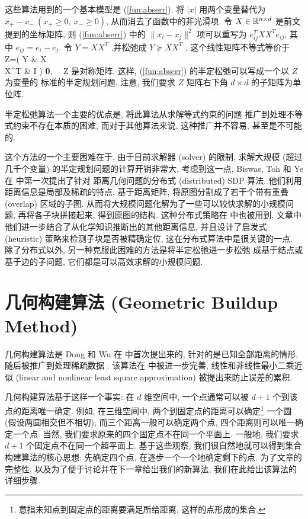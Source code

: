\documentclass{CASthesis_zzk}
\begin{document}
这些算法用到的一个基本模型是 (\ref{fun:abserr}). 
将 $|x|$ 用两个变量替代为 $x_+-x_- ~(x_+\geq 0,~x_-\geq 0)$, 
从而消去了函数中的非光滑项.
令 $X\in \mathbb{R}^{n\times d}$ 是前文提到的坐标矩阵,
则 (\ref{fun:abserr}) 中的 $\|x_i-x_j\|^2$ 项可以重写为 $e_{ij}^TXX^Te_{ij}$, 
其中 $e_{ij}=e_i-e_j$. 
令 $Y=XX^T$ ,并松弛成 $Y\succeq XX^T$ \cite{Boyd1994}, 
这个线性矩阵不等式等价于
\be Z=\left( Y & X \\ X^T & I \ea \right) \succeq \textbf{0}, ~~Z \textrm{ 是对称矩阵}.\ee
这样, (\ref{fun:abserr}) 的半定松弛可以写成一个以 $Z$ 为变量的
标准的半定规划问题. 注意, 我们要求 $Z$ 矩阵右下角 $d \times d$ 的子矩阵为单位阵.

半定松弛算法一个主要的优点是, 将此算法从求解等式约束的问题
推广到处理不等式约束不存在本质的困难, 
而对于其他算法来说, 这种推广并不容易, 甚至是不可能的.

这个方法的一个主要困难在于, 由于目前求解器 (solver) 的限制,
求解大规模 (超过几千个变量) 的半定规划问题的计算开销非常大.
考虑到这一点, Biswas, Toh 和 Ye 在 \cite{Biswas2008} 中第一次提出了针对
距离几何问题的分布式 (distributed) SDP 算法.
他们利用距离信息是局部及稀疏的特点, 基于距离矩阵,
将原图分割成了若干个带有重叠 (overlap) 区域的子图.
从而将大规模问题化解为了一些可以较快求解的小规模问题,
再将各子块拼接起来, 得到原图的结构. 
这种分布式策略在 \cite{Fang2013} 中也被用到, 
文章中他们进一步结合了从化学知识推断出的其他距离信息, 
并且设计了启发式 (heuristic) 策略来检测子块是否被精确定位,
这在分布式算法中是很关键的一点.
除了分布式以外, 另一种克服此困难的方法是将半定松弛进一步松弛 \cite{Wang2008} 
成基于结点或基于边的子问题, 它们都是可以高效求解的小规模问题.



\section{几何构建算法 (Geometric Buildup Method)}
\label{sec:GB}

几何构建算法是 Dong 和 Wu 在 \cite{Dong2002} 中首次提出来的, 
针对的是已知全部距离的情形, 
随后被推广到处理稀疏数据 \cite{Wu2006}. 
该算法在 \cite{Wu2008,Sit2009} 中被进一步完善, 
线性和非线性最小二乘近似 (linear and nonlinear least square approximation)
被提出来防止误差的累积.

几何构建算法基于这样一个事实: 在 $d$ 维空间中,
一个点通常可以被 $d+1$ 个到该点的距离唯一确定.
例如, 在三维空间中, 两个到固定点的距离可以确定\footnote{意指未知点到固定点的距离要满足所给距离, 这样的点形成的集合.}
一个圆 (假设两圆相交但不相切); 
而三个距离一般可以确定两个点, 四个距离则可以唯一确定一个点.
当然, 我们要求原来的四个固定点不在同一个平面上.
一般地, 我们要求 $d+1$ 个固定点不在同一个超平面上.
基于这些观察, 我们很自然地就可以得到集合构建算法的核心思想:
先确定四个点, 在逐步一个一个地确定剩下的点.
为了文章的完整性, 以及为了便于讨论并在下一章给出我们的新算法,
我们在此给出该算法的详细步骤.
\end{document}
